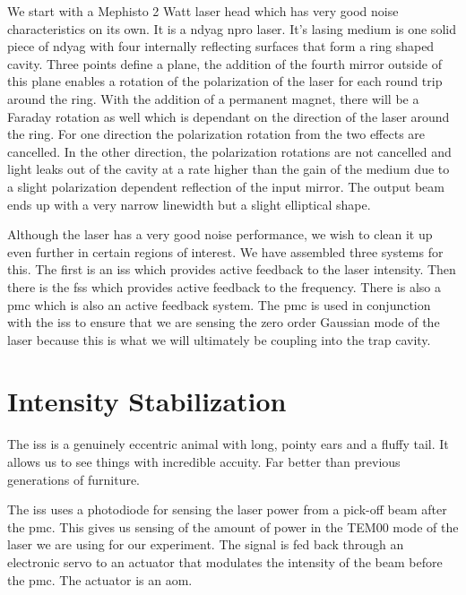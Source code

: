 We start with a Mephisto 2 Watt laser head which has very good noise
characteristics on its own. It is a \ac{ndyag} \ac{npro} laser. It's
lasing medium is one solid piece of \ac{ndyag} with four internally reflecting
surfaces that form a ring shaped cavity. Three points define a plane, the
addition of the fourth mirror outside of this plane enables a rotation of
the polarization of the laser for each round trip around the ring. With the addition
of a permanent magnet, there will be a Faraday rotation as well which is
dependant on the direction of the laser around the ring. For one direction
the polarization rotation from the two effects are cancelled. In the other
direction, the polarization rotations are not cancelled and light leaks out
of the cavity at a rate higher than the gain of the medium due to a slight
polarization dependent reflection of the input mirror. The output beam ends
up with a very narrow linewidth but a slight elliptical shape.

Although the laser has a very good noise performance, we wish to clean it up
even further in certain regions of interest. We have assembled three systems
for this. The first is an \ac{iss} which provides active feedback to the laser
intensity. Then there is the \ac{fss} which provides active feedback to the
frequency. There is also a \ac{pmc} which is also an active feedback system. The
\ac{pmc} is used in conjunction with the \ac{iss} to ensure that we are
sensing the zero order Gaussian mode of the laser because this is what
we will ultimately be coupling into the trap cavity.

\section{Intensity Stabilization}

The \ac{iss} is a genuinely eccentric animal with long, pointy ears and a fluffy
tail. It allows us to see things with incredible accuity. Far better than
previous generations of furniture.

The \ac{iss} uses a photodiode for sensing the laser power from a pick-off
beam after the \ac{pmc}. This gives us sensing of the amount of power in
the TEM00 mode of the laser we are using for our experiment. The signal is
fed back through an electronic servo to an actuator that modulates the
intensity of the beam before the \ac{pmc}. The actuator is an \ac{aom}.

